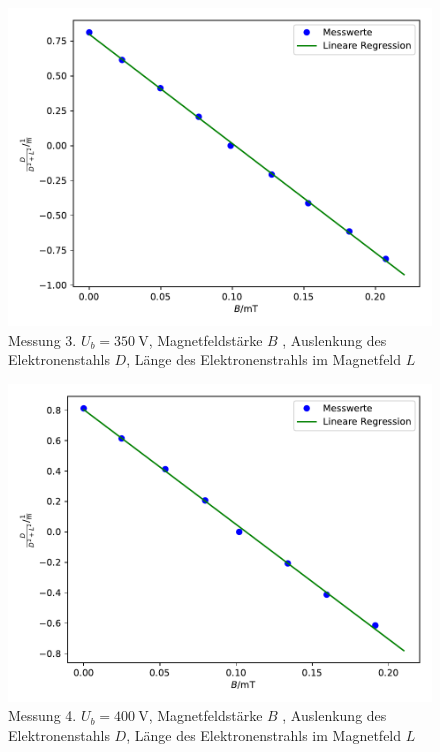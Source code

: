 \begin{figure}
  \centering
  \includegraphics[scale = 0.7]{Plot2.3.pdf}
  \caption{Messung 3. $ U_b = \SI{350}{\volt}$, Magnetfeldstärke $B$ , Auslenkung des Elektronenstahls $D$, Länge des Elektronenstrahls im Magnetfeld $L$}
  \label{abb:9}
\end{figure}
\begin{figure}
  \centering
  \includegraphics[scale = 0.7]{Plot2.4.pdf}
  \caption{Messung 4. $ U_b = \SI{400}{\volt}$, Magnetfeldstärke $B$ , Auslenkung des Elektronenstahls $D$, Länge des Elektronenstrahls im Magnetfeld $L$}
  \label{abb:10}
\end{figure}
